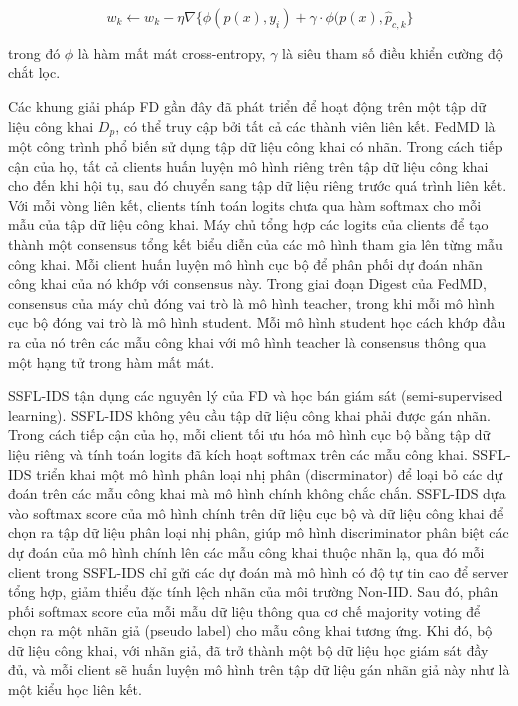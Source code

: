 \begin{equation}
\label{federateddistillation}
w_k \leftarrow w_k - \eta \nabla\{\phi(p(x),y_i) + \gamma \cdot \phi(p(x), \hat{p}_{c,k}\}
\end{equation}

trong đó $\phi$ là hàm mất mát cross-entropy, $\gamma$ là siêu tham số điều khiển cường độ chắt lọc.

Các khung giải pháp FD gần đây đã phát triển để hoạt động trên một tập dữ liệu công khai $D_p$, có thể truy cập bởi tất cả các thành viên liên kết. FedMD \cite{li2019fedmd} là một công trình phổ biến sử dụng tập dữ liệu công khai có nhãn. Trong cách tiếp cận của họ, tất cả clients huấn luyện mô hình riêng trên tập dữ liệu công khai cho đến khi hội tụ, sau đó chuyển sang tập dữ liệu riêng trước quá trình liên kết. Với mỗi vòng liên kết, clients tính toán logits chưa qua hàm softmax cho mỗi mẫu của tập dữ liệu công khai. Máy chủ tổng hợp các logits của clients để tạo thành một consensus tổng kết biểu diễn của các mô hình tham gia lên từng mẫu công khai. Mỗi client huấn luyện mô hình cục bộ để phân phối dự đoán nhãn công khai của nó khớp với consensus này. Trong giai đoạn Digest của FedMD, consensus của máy chủ đóng vai trò là mô hình teacher, trong khi mỗi mô hình cục bộ đóng vai trò là mô hình student. Mỗi mô hình student học cách khớp đầu ra của nó trên các mẫu công khai với mô hình teacher là consensus thông qua một hạng tử trong hàm mất mát.

SSFL-IDS \cite{zhao2022ssfl} tận dụng các nguyên lý của FD và học bán giám sát (semi-supervised learning). SSFL-IDS không yêu cầu tập dữ liệu công khai phải được gán nhãn. Trong cách tiếp cận của họ, mỗi client tối ưu hóa mô hình cục bộ bằng tập dữ liệu riêng và tính toán logits đã kích hoạt softmax trên các mẫu công khai. SSFL-IDS triển khai một mô hình phân loại nhị phân (discrminator) để loại bỏ các dự đoán trên các mẫu công khai mà mô hình chính không chắc chắn. SSFL-IDS dựa vào softmax score của mô hình chính trên dữ liệu cục bộ và dữ liệu công khai để chọn ra tập dữ liệu phân loại nhị phân, giúp mô hình discriminator phân biệt các dự đoán của mô hình chính lên các mẫu công khai thuộc nhãn lạ, qua đó mỗi client trong SSFL-IDS chỉ gửi các dự đoán mà mô hình có độ tự tin cao để server tổng hợp, giảm thiểu đặc tính lệch nhãn của môi trường Non-IID. Sau đó, phân phối softmax score của mỗi mẫu dữ liệu thông qua cơ chế majority voting để chọn ra một nhãn giả (pseudo label) cho mẫu công khai tương ứng. Khi đó, bộ dữ liệu công khai, với nhãn giả, đã trở thành một bộ dữ liệu học giám sát đầy đủ, và mỗi client sẽ huấn luyện mô hình trên tập dữ liệu gán nhãn giả này như là một kiểu học liên kết.

